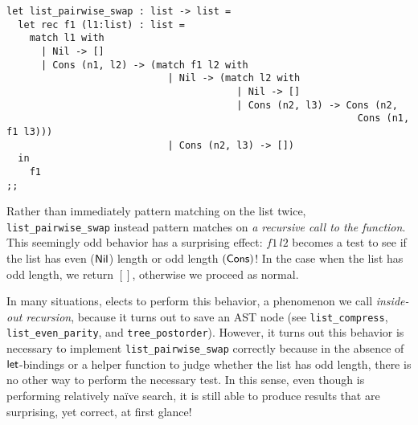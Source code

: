 \begin{center}
  \begin{minipage}{0.95\textwidth}
    \begin{lstlisting}
let list_pairwise_swap : list -> list =
  let rec f1 (l1:list) : list =
    match l1 with
      | Nil -> []
      | Cons (n1, l2) -> (match f1 l2 with
                            | Nil -> (match l2 with
                                        | Nil -> []
                                        | Cons (n2, l3) -> Cons (n2,
                                                             Cons (n1, f1 l3)))
                            | Cons (n2, l3) -> [])
  in
    f1
;;
    \end{lstlisting}
  \end{minipage}
\end{center}

Rather than immediately pattern matching on the list twice, \texttt{list\_pairwise\_swap} instead pattern matches on \emph{a recursive call to the function}.
This seemingly odd behavior has a surprising effect: $f1\,l2$ becomes a test to see if the list has even ($\mathsf{Nil}$) length or odd length $(\mathsf{Cons})$!
In the case when the list has odd length, we return $[]$, otherwise we proceed as normal.

In many situations, \myth{} elects to perform this behavior, a phenomenon we call \emph{inside-out recursion}, because it turns out to save an AST node (see \texttt{list\_compress}, \texttt{list\_even\_parity}, and \texttt{tree\_postorder}).
However, it turns out this behavior is necessary to implement \texttt{list\_pairwise\_swap} correctly because in the absence of $\mathsf{let}$-bindings or a helper function to judge whether the list has odd length, there is no other way to perform the necessary test.
In this sense, even though \myth{} is performing relatively na\"{i}ve search, it is still able to produce results that are surprising, yet correct, at first glance!
